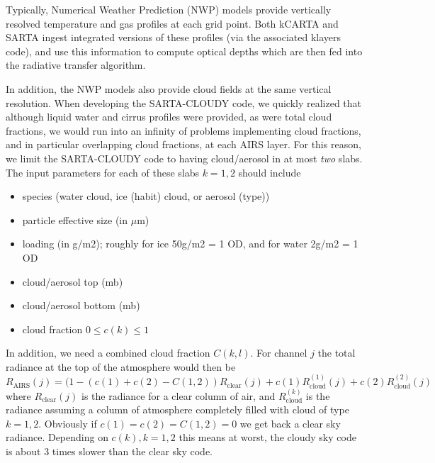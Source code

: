 \documentclass[11pt]{article}
\newcommand{\kc}{\textsf{kCARTA}\xspace}
\newcommand{\sa}{\textsf{SARTA}\xspace}
\newcommand{\sasc}{\textsf{SARTA-CLOUDY}\xspace}
\begin{document}
Typically, Numerical Weather Prediction (NWP) models provide
vertically resolved temperature and gas profiles at each grid
point. Both \kc and \sa ingest integrated versions of these profiles
(via the associated \textsf{klayers} code), and use this information
to compute optical depths which are then fed into the radiative
transfer algorithm.

In addition, the NWP models also provide cloud fields at the same
vertical resolution. When developing the \sasc code, we quickly
realized that although liquid water and cirrus profiles were provided,
as were total cloud fractions, we would run into an infinity of
problems implementing cloud fractions, and in particular overlapping
cloud fractions, at each AIRS layer. For this reason, we limit the
\sasc code to having cloud/aerosol in at most \emph{two} slabs. The input
parameters for each of these slabs $k=1,2$ should include
\begin{itemize}
\item species (water cloud, ice (habit) cloud, or aerosol
  (type))
\item particle effective size (in $\mu$m)
\item loading (in g/m2); roughly for ice 50g/m2 = 1 OD, and for water
  2g/m2 = 1 OD
\item cloud/aerosol top (mb)
\item cloud/aerosol bottom (mb)
\item cloud fraction $0 \le c(k) \le 1$
\end{itemize}

In addition, we need a combined cloud fraction $C(k,l)$. For channel
$j$ the total radiance at the top of the atmosphere would then be
\[
R_{\text{AIRS}}(j) = (1 - (c(1) + c(2) - C(1,2)) R_{\text{clear}}(j) +
c(1) R^{(1)}_{\text{cloud}}(j) + c(2) R^{(2)}_{\text{cloud}}(j)
\]
where $R_{\text{clear}}(j)$ is the radiance for a clear column of air,
and $R^{(k)}_{\text{cloud}}$ is the radiance assuming a column of
atmosphere completely filled with cloud of type $k=1,2$. Obviously if
$c(1) = c(2) = C(1,2) = 0$ we get back a clear sky radiance. Depending
on $c(k),k=1,2$ this means at worst, the cloudy sky code is about 3
times slower than the clear sky code.

\end{document}
